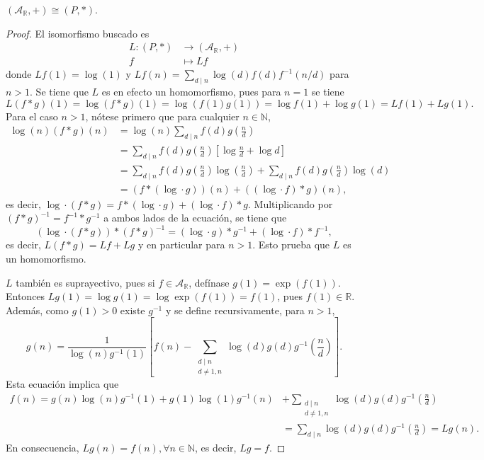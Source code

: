 \begin{lemma}\label{prop:iso1}
$(\mathcal{A}_{\mathbb{R}},+) \cong (P,*)$.
\end{lemma}
\begin{proof}
El isomorfismo buscado es
\begin{align*}
    L : (P,*) & \longrightarrow (\mathcal{A}_{\mathbb{R}},+) \\
    f & \longmapsto L f
\end{align*}
donde $L f(1)=\log(1)$ y $L f(n)=\sum_{d \mid n} \log(d)f(d)f^{-1}(n/d)$ para $n>1$. Se tiene que $L$ es en efecto un homomorfismo, pues para $n=1$ se tiene
\begin{equation*}
    L (f*g)(1) = \log (f*g) (1) = \log(f(1)g(1)) = \log f(1) + \log g(1) = L f(1) + L g(1).
\end{equation*}
Para el caso $n>1$, nótese primero que para cualquier $n \in \mathbb{N}$,
\begin{align*}
	\log(n)(f*g)(n) &= \log(n) \sum_{d \mid n} f(d)g \left( \frac{n}{d} \right) \\
					&= \sum_{d \mid n} f(d) g \left( \frac{n}{d} \right) \left[ \log \frac{n}{d} + \log d \right] \\
					&= \sum_{d \mid n} f(d) g \left( \frac{n}{d} \right) \log \left( \frac{n}{d} \right) + \sum_{d \mid n} f(d) g \left( \frac{n}{d} \right) \log(d) \\
					&= (f*(\log \cdot g))(n)+((\log \cdot f)*g)(n),
\end{align*}
es decir, $\log \cdot (f*g) = f*(\log \cdot g)+(\log \cdot f)*g$. Multiplicando por $(f*g)^{-1}=f^{-1}*g^{-1}$ a ambos lados de la ecuación, se tiene que
\begin{equation*}
	(\log \cdot (f*g))*(f*g)^{-1} = (\log \cdot g)*g^{-1} + (\log \cdot f)*f^{-1},
\end{equation*}
es decir, $L(f*g)=L f+L g$ y en particular para $n>1$. Esto prueba que $L$ es un homomorfismo.
\bigskip

$L$ también es suprayectivo, pues si $f \in \mathcal{A}_{\mathbb{R}}$, defínase $g(1)=\exp(f(1))$. Entonces $L g(1)=\log g(1)=\log \exp(f(1))=f(1)$, pues $f(1) \in \mathbb{R}$. Además, como $g(1)>0$ existe $g^{-1}$ y se define recursivamente, para $n>1$,
\begin{equation*}
    g(n) = \frac{1}{\log(n) g^{-1}(1)} \left[ f(n) - \sum_{\substack{d \mid n \\ d \ne 1,n}} \log(d) g(d) g^{-1} \left( \frac{n}{d} \right)\right].
\end{equation*}
Esta ecuación implica que
\begin{align*}
	f(n) = g(n)\log(n)g^{-1}(1)+g(1)\log(1)g^{-1}(n)&+\sum_{\substack{d \mid n \\ d \ne 1,n}} \log(d)g(d)g^{-1} \left( \frac{n}{d} \right) \\
		 &= \sum_{d \mid n} \log(d)g(d)g^{-1} \left( \frac{n}{d} \right) = L g(n).
\end{align*}
En consecuencia, $L g(n)=f(n), \forall n \in \mathbb{N}$, es decir, $L g=f$.
\bigskip


\end{proof}
